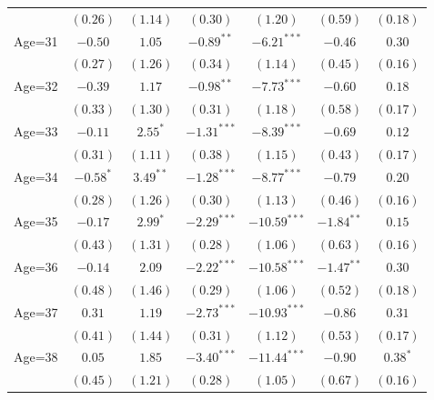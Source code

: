 \documentclass[fullpage]{paper}
\begin{document}
\begin{center}
\begin{longtable}{l c c c c c c }
            & $(0.26)$      & $(1.14)$      & $(0.30)$       & $(1.20)$       & $(0.59)$      & $(0.18)$      \\
Age=31      & $-0.50$       & $1.05$        & $-0.89^{**}$   & $-6.21^{***}$  & $-0.46$       & $0.30$        \\
            & $(0.27)$      & $(1.26)$      & $(0.34)$       & $(1.14)$       & $(0.45)$      & $(0.16)$      \\
Age=32      & $-0.39$       & $1.17$        & $-0.98^{**}$   & $-7.73^{***}$  & $-0.60$       & $0.18$        \\
            & $(0.33)$      & $(1.30)$      & $(0.31)$       & $(1.18)$       & $(0.58)$      & $(0.17)$      \\
Age=33      & $-0.11$       & $2.55^{*}$    & $-1.31^{***}$  & $-8.39^{***}$  & $-0.69$       & $0.12$        \\
            & $(0.31)$      & $(1.11)$      & $(0.38)$       & $(1.15)$       & $(0.43)$      & $(0.17)$      \\
Age=34      & $-0.58^{*}$   & $3.49^{**}$   & $-1.28^{***}$  & $-8.77^{***}$  & $-0.79$       & $0.20$        \\
            & $(0.28)$      & $(1.26)$      & $(0.30)$       & $(1.13)$       & $(0.46)$      & $(0.16)$      \\
Age=35      & $-0.17$       & $2.99^{*}$    & $-2.29^{***}$  & $-10.59^{***}$ & $-1.84^{**}$  & $0.15$        \\
            & $(0.43)$      & $(1.31)$      & $(0.28)$       & $(1.06)$       & $(0.63)$      & $(0.16)$      \\
Age=36      & $-0.14$       & $2.09$        & $-2.22^{***}$  & $-10.58^{***}$ & $-1.47^{**}$  & $0.30$        \\
            & $(0.48)$      & $(1.46)$      & $(0.29)$       & $(1.06)$       & $(0.52)$      & $(0.18)$      \\
Age=37      & $0.31$        & $1.19$        & $-2.73^{***}$  & $-10.93^{***}$ & $-0.86$       & $0.31$        \\
            & $(0.41)$      & $(1.44)$      & $(0.31)$       & $(1.12)$       & $(0.53)$      & $(0.17)$      \\
Age=38      & $0.05$        & $1.85$        & $-3.40^{***}$  & $-11.44^{***}$ & $-0.90$       & $0.38^{*}$    \\
            & $(0.45)$      & $(1.21)$      & $(0.28)$       & $(1.05)$       & $(0.67)$      & $(0.16)$      \\

\end{longtable}
\end{center}
\end{document}
